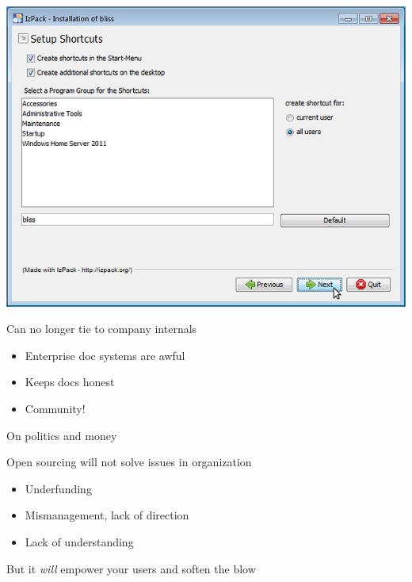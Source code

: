\documentclass[pdf]{beamer}
\begin{document}
\begin{frame}
    \includegraphics[width=\textwidth, keepaspectratio]{img/installer}
\end{frame}

\begin{frame}
    Can no longer tie to company internals

    \begin{itemize}
        \item Enterprise doc systems are awful
        \item Keeps docs honest
        \item Community!
    \end{itemize}
\end{frame}

\begin{frame}
    \begin{center}
        On politics and money
    \end{center}
\end{frame}

\begin{frame}
    Open sourcing will not solve issues in organization
    \begin{itemize}
        \item Underfunding
        \item Mismanagement, lack of direction
        \item Lack of understanding
    \end{itemize}
    But it \emph{will} empower your users and soften the blow
\end{frame}
\end{document}

